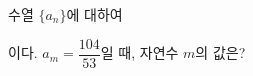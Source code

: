 수열 $\{a_n\}$에 대하여\par\smallskip{}\par\smallskip\noindent 이다. $a_m=\dfrac{104}{53}$일 때, 자연수 $m$의 값은?
